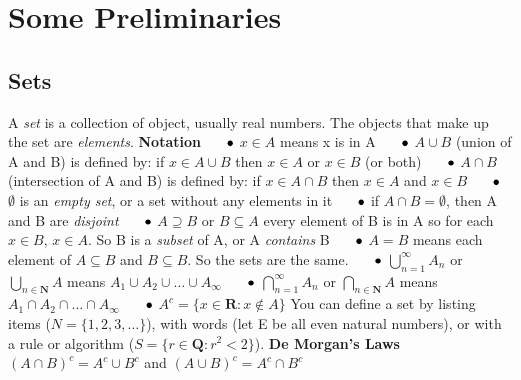 \section{Some Preliminaries}
    \subsection*{Sets}
        A \textit{set} is a collection of object, usually real numbers. The objects that make up the set are \textit{elements}.
        \newline
        \textbf{Notation}
            \newline
            $\indent \bullet$ $x \in A$ means x is in A
            \newline
            $\indent \bullet$ $A \cup B$ (union of A and B) is defined by: if $x \in A \cup B$ then $x \in A$ or $x \in B$ (or both)
            \newline
            $\indent \bullet$ $A \cap B$ (intersection of A and B) is defined by: if $x \in A \cap B$ then $x \in A$ and $x \in B$
            \newline
            $\indent \bullet$ $\emptyset$ is an \textit{empty set}, or a set without any elements in it
            \newline
            $\indent \bullet$ if $A \cap B = \emptyset$, then A and B are \textit{disjoint}
            \newline
            $\indent \bullet$ $A \supseteq B$ or $B \subseteq A$ every element of B is in A so for each $x \in B$, $x \in A$. So B is a \textit{subset} of A, or A \textit{contains} B
            \newline
            $\indent \bullet$ $A = B$ means each element of $A \subseteq B$ and $B \subseteq B$. So the sets are the same.
            \newline
            $\indent \bullet$ $\bigcup\limits_{n=1}^{\infty} A_n$ or $\bigcup\limits_{n \in \textbf{N}} A$ means $A_1 \cup A_2 \cup \dots \cup A_\infty$
            \newline
            $\indent \bullet$ $\bigcap\limits_{n=1}^{\infty} A_n$ or $\bigcap\limits_{n \in \textbf{N}} A$ means $A_1 \cap A_2 \cap \dots \cap A_\infty$
            \newline
            $\indent \bullet$ $A^c = \{x \in \textbf{R}: x \notin A\}$
            \newline \newline
        You can define a set by listing items ($N = \{1, 2, 3, \dots\}$), with words (let E be all even natural numbers), or with a rule or algorithm ($S = \{r \in \textbf{Q}: r^2 < 2\}$).
        \newline \newline
        \textbf{De Morgan's Laws}
            \newline
            $(A \cap B)^c = A^c \cup B^c$ and $(A \cup B)^c = A^c \cap B^c$
